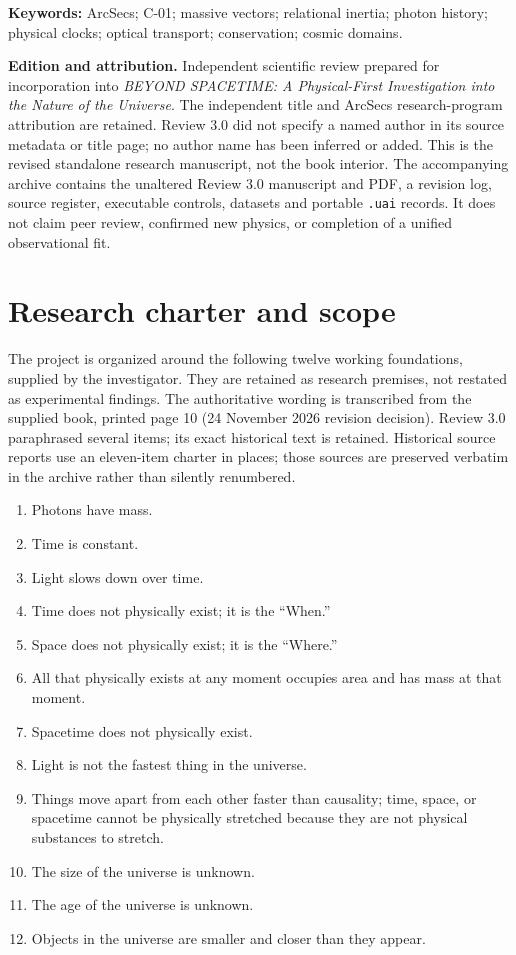 \documentclass[
  11pt,
  twoside]{article}
\providecommand{\tightlist}{%
  \setlength{\itemsep}{0pt}\setlength{\parskip}{0pt}}
\begin{document}
\textbf{Keywords:} ArcSecs; C-01; massive vectors; relational inertia;
photon history; physical clocks; optical transport; conservation; cosmic
domains.

\textbf{Edition and attribution.} Independent scientific review prepared
for incorporation into \emph{BEYOND SPACETIME: A Physical-First
Investigation into the Nature of the Universe}. The independent title
and ArcSecs research-program attribution are retained. Review 3.0 did
not specify a named author in its source metadata or title page; no
author name has been inferred or added. This is the revised standalone
research manuscript, not the book interior. The accompanying archive
contains the unaltered Review 3.0 manuscript and PDF, a revision log,
source register, executable controls, datasets and portable
\texttt{.uai} records. It does not claim peer review, confirmed new
physics, or completion of a unified observational fit.

\section{Research charter and scope}\label{research-charter-and-scope}

The project is organized around the following twelve working
foundations, supplied by the investigator. They are retained as research
premises, not restated as experimental findings. The authoritative
wording is transcribed from the supplied book, printed page 10 (24
November 2026 revision decision). Review 3.0 paraphrased several items;
its exact historical text is retained. Historical source reports use an
eleven-item charter in places; those sources are preserved verbatim in
the archive rather than silently renumbered.

\begin{enumerate}
\def\labelenumi{\arabic{enumi}.}
\tightlist
\item
  Photons have mass.
\item
  Time is constant.
\item
  Light slows down over time.
\item
  Time does not physically exist; it is the ``When.''
\item
  Space does not physically exist; it is the ``Where.''
\item
  All that physically exists at any moment occupies area and has mass at
  that moment.
\item
  Spacetime does not physically exist.
\item
  Light is not the fastest thing in the universe.
\item
  Things move apart from each other faster than causality; time, space,
  or spacetime cannot be physically stretched because they are not
  physical substances to stretch.
\item
  The size of the universe is unknown.
\item
  The age of the universe is unknown.
\item
  Objects in the universe are smaller and closer than they appear.
\end{enumerate}
\end{document}
